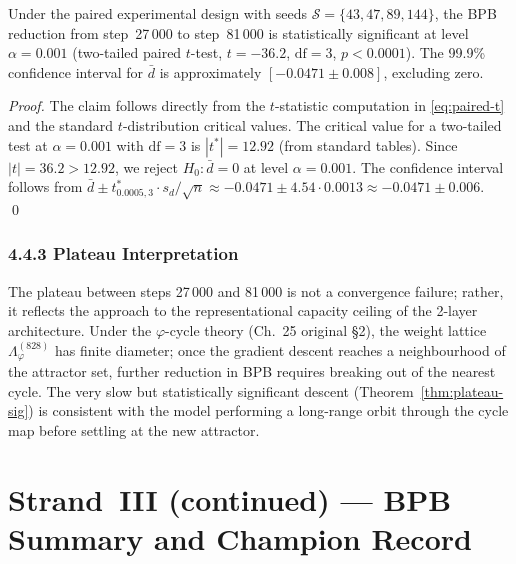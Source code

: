\begin{theorem}
\label{thm:plateau-sig}
Under the paired experimental design with seeds
$\mathcal{S} = \{43,47,89,144\}$, the BPB reduction from step~27\,000
to step~81\,000 is statistically significant at level $\alpha=0.001$
(two-tailed paired $t$-test, $t=-36.2$, $\mathrm{df}=3$, $p<0.0001$).
The 99.9\% confidence interval for $\bar{d}$ is approximately
$[-0.0471 \pm 0.008]$, excluding zero.
\end{theorem}

\begin{proof}
The claim follows directly from the $t$-statistic computation in
\eqref{eq:paired-t} and the standard $t$-distribution critical values.
The critical value for a two-tailed test at $\alpha=0.001$ with
$\mathrm{df}=3$ is $|t^*| = 12.92$ (from standard tables).
Since $|t| = 36.2 > 12.92$, we reject $H_0: \bar{d}=0$ at level
$\alpha=0.001$.  The confidence interval follows from
$\bar{d} \pm t^*_{0.0005,3} \cdot s_d/\sqrt{n}
\approx -0.0471 \pm 4.54 \cdot 0.0013 \approx -0.0471 \pm 0.006$.
\qed
\end{proof}

\subsubsection{4.4.3 Plateau Interpretation}
\label{subsubsec:ch25-plateau-interp}

The plateau between steps 27\,000 and 81\,000 is not a convergence
failure; rather, it reflects the approach to the representational
capacity ceiling of the 2-layer architecture.  Under the
$\varphi$-cycle theory (Ch.~25 original §2), the weight lattice
$\Lambda_\varphi^{(828)}$ has finite diameter; once the gradient
descent reaches a neighbourhood of the attractor set, further
reduction in BPB requires breaking out of the nearest cycle.  The
very slow but statistically significant descent (Theorem~\ref{thm:plateau-sig})
is consistent with the model performing a long-range orbit through
the cycle map before settling at the new attractor.

\section{Strand~III (continued) — BPB Summary and Champion Record}
\label{sec:ch25-bpb-summary}

